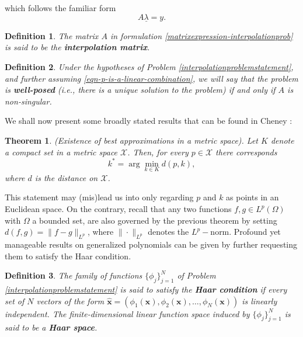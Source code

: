 \documentclass[12pt]{report} %
\newtheorem{definition}{Definition}
\newtheorem{theorem}{Theorem}
\newcommand{\tmmathbf}[1]{\ensuremath{\boldsymbol{#1}}}
\newcommand{\tmstrong}[1]{\textbf{#1}}
\begin{document}
which follows the familiar form
\begin{equation}
  A \underline{\lambda} = y \label{matrixexpression-interpolationprob} .
\end{equation}
\begin{definition}
  The matrix $A$ in formulation \eqref{matrixexpression-interpolationprob} is said to
  be the {\tmstrong{interpolation matrix}}.
\end{definition}

\begin{definition}
  Under the hypotheses of Problem \ref{interpolationproblemstatement}, and
  further assuming \eqref{eqn-p-is-a-linear-combination}, we will say that the problem is
  {\tmstrong{well-posed}} (i.e., there is a unique solution to the problem) if
  and only if $A$ is non-singular.
\end{definition}


We shall now present some broadly stated results that can be found in Cheney \cite{cheney1966introduction}:

\begin{theorem}
  (Existence of best approximations in a metric space). Let $K$ denote a
  compact set in a metric space $\mathcal{X}$. Then, for every $p \in
  \mathcal{X}$ there corresponds
  \[ k^{\ast} = \arg \min_{k \in K} d (p, k), \]
  where $d$ is the distance on $\mathcal{X}$.
\end{theorem}

This statement may (mis)lead us into only regarding $p$ and $k$ as points in
an Euclidean space. On the contrary, recall that any two functions $f, g \in
L^p (\Omega)$ with $\Omega$ a bounded set, are also governed by the previous
theorem by setting $d (f, g) = \| f - g \|_{L^p}$, where $\| \cdot \|_{L^p}$
denotes the $L^p -$norm. Profound yet manageable results on generalized
polynomials can be given by further requesting them to satisfy the Haar
condition.

\begin{definition}
  The family of functions $\{ \phi_j \}_{j = 1}^N$ of Problem
  \ref{interpolationproblemstatement} is said to satisfy the {\tmstrong{Haar
  condition}} if every set of $N$ vectors of the form $\hat{\tmmathbf{x}} =
  (\phi_1 (\tmmathbf{x}), \phi_2 (\tmmathbf{x}), \ldots, \phi_N
  (\tmmathbf{x}))$ is linearly independent. The finite-dimensional linear function space induced by $\{ \phi_j \}_{j = 1}^N$ is said to be a {\tmstrong{Haar
  space}}.
\end{definition}
\end{document}
